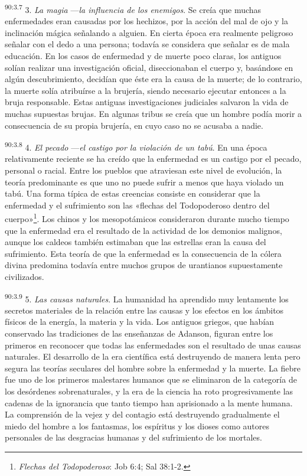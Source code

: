 \par
\textsuperscript{90:3.7} 3. \textit{La magia} ---\textit{la influencia de los enemigos}. Se creía que muchas enfermedades eran causadas por los hechizos, por la acción del mal de ojo y la inclinación mágica señalando a alguien. En cierta época era realmente peligroso señalar con el dedo a una persona; todavía se considera que señalar es de mala educación. En los casos de enfermedad y de muerte poco claras, los antiguos solían realizar una investigación oficial, diseccionaban el cuerpo y, basándose en algún descubrimiento, decidían que éste era la causa de la muerte; de lo contrario, la muerte solía atribuírse a la brujería, siendo necesario ejecutar entonces a la bruja responsable. Estas antiguas investigaciones judiciales salvaron la vida de muchas supuestas brujas. En algunas tribus se creía que un hombre podía morir a consecuencia de su propia brujería, en cuyo caso no se acusaba a nadie.

\par
\textsuperscript{90:3.8} 4. \textit{El pecado} ---\textit{el castigo por la violación de un tabú}. En una época relativamente reciente se ha creído que la enfermedad es un castigo por el pecado, personal o racial. Entre los pueblos que atraviesan este nivel de evolución, la teoría predominante es que uno no puede sufrir a menos que haya violado un tabú. Una forma típica de estas creencias consiste en considerar que la enfermedad y el sufrimiento son las «flechas del Todopoderoso dentro del cuerpo»\footnote{\textit{Flechas del Todopoderoso}: Job 6:4; Sal 38:1-2.}. Los chinos y los mesopotámicos consideraron durante mucho tiempo que la enfermedad era el resultado de la actividad de los demonios malignos, aunque los caldeos también estimaban que las estrellas eran la causa del sufrimiento. Esta teoría de que la enfermedad es la consecuencia de la cólera divina predomina todavía entre muchos grupos de urantianos supuestamente civilizados.

\par
\textsuperscript{90:3.9} 5. \textit{Las causas naturales}. La humanidad ha aprendido muy lentamente los secretos materiales de la relación entre las causas y los efectos en los ámbitos físicos de la energía, la materia y la vida. Los antiguos griegos, que habían conservado las tradiciones de las enseñanzas de Adanson, figuran entre los primeros en reconocer que todas las enfermedades son el resultado de unas causas naturales. El desarrollo de la era científica está destruyendo de manera lenta pero segura las teorías seculares del hombre sobre la enfermedad y la muerte. La fiebre fue uno de los primeros malestares humanos que se eliminaron de la categoría de los desórdenes sobrenaturales, y la era de la ciencia ha roto progresivamente las cadenas de la ignorancia que tanto tiempo han aprisionado a la mente humana. La comprensión de la vejez y del contagio está destruyendo gradualmente el miedo del hombre a los fantasmas, los espíritus y los dioses como autores personales de las desgracias humanas y del sufrimiento de los mortales.

